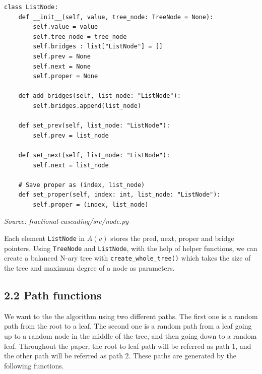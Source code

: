 \documentclass[12pt,english,]{article}
\newcommand{\code}[1]{\colorbox{light-gray}{\texttt{#1}}}
\begin{document}
\begin{lstlisting}
class ListNode:
    def __init__(self, value, tree_node: TreeNode = None):
        self.value = value
        self.tree_node = tree_node
        self.bridges : list["ListNode"] = []
        self.prev = None
        self.next = None
        self.proper = None
    
    def add_bridges(self, list_node: "ListNode"):
        self.bridges.append(list_node)

    def set_prev(self, list_node: "ListNode"):
        self.prev = list_node

    def set_next(self, list_node: "ListNode"):
        self.next = list_node
    
    # Save proper as (index, list_node)
    def set_proper(self, index: int, list_node: "ListNode"):
        self.proper = (index, list_node)
\end{lstlisting}
\vspace{-9truemm}
\begin{minipage}{1\textwidth}
  \begin{flushright}
  {\footnotesize \emph{Source: fractional-cascading/src/node.py }\par}
  \end{flushright}
\end{minipage}
\vspace{0.5truemm}

Each element \code{ListNode} in $A(v)$ stores the pred, next, proper and bridge pointers. Using \code{TreeNode} and \code{ListNode}, with the help of helper functions, we can create a balanced N-ary tree with \code{create\_whole\_tree()} which takes the size of the tree and maximum degree of a node as parameters.

\hypertarget{section2.2}{%
\subsection{\texorpdfstring{2.2 Path functions}{2.2 Path functions}}\label{section2.2}}

We want to the the algorithm using two different paths. The first one is a random path from 
the root to a leaf. The second one is a random path from a leaf going up to a random node in 
the middle of the tree, and then going down to a random leaf. Throughout the paper, the root 
to leaf path will be referred as path 1, and the other path will be referred as path 2. These
paths are generated by the following functions.

~
\end{document}
